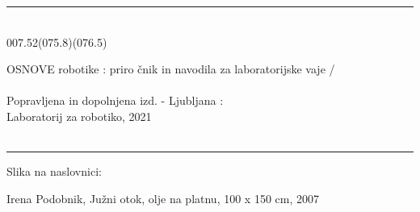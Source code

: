 \documentclass{kapmono}
\theoremstyle{definition}
\theoremstyle{plain}
\begin{document}


\thispagestyle{empty}
\parindent0cm
\normalsize {
\rule{12cm}{0.5pt} \\ %
%

\vskip13pt %
007.52(075.8)(076.5)

\hskip0.7cm   OSNOVE robotike : priro \v cnik in navodila za
laboratorijske vaje /\\
\\ Popravljena in dopolnjena izd. - Ljubljana : \\
Laboratorij za robotiko, 2021   %
\\ \\



\vskip5pt %
\rule{12cm}{0.5pt}
\vskip10pt %
Slika na naslovnici:

\hskip0.7cm Irena Podobnik, Ju\v zni otok, olje na platnu, 100 x 150
cm, 2007

\vskip0.5in

%
%

\vskip0.5in




\vskip10pt


}
\end{document}
